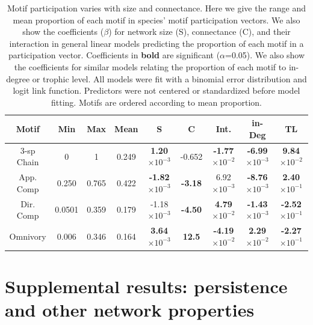 \documentclass[12pt]{article}
\begin{document}
\begin{spacing}{2.0}
    \begin{table}[hb!]
        \centering
        \caption{Motif participation varies with size and connectance. Here we give the range and mean proportion of each motif in species' motif participation vectors. 
        We also show the coefficients ($\beta$) for network size (S), connectance (C), and their interaction in general linear models predicting the proportion of each motif in a participation vector.
        Coefficients in \textbf{bold} are significant ($\alpha$=0.05).
        We also show the coefficients for similar models relating the proportion of each motif to in-degree or trophic level.
        All models were fit with a binomial error distribution and logit link function.
        Predictors were not centered or standardized before model fitting. Motifs are ordered according to mean proportion.}
        \label{tab:partic_vs_SC}   
        \footnotesize
        \begin{tabular}{c|c c c | c c c | c | c}
            Motif & Min & Max & Mean & S & C & Int. & in-Deg & TL \\
            \hline
            3-sp Chain & 0 & 1 & 0.249 & \textbf{1.20$\times10^{-3}$} &  -0.652 & \textbf{-1.77$\times10^{-2}$} & \textbf{-6.99$\times10^{-3}$} & \textbf{9.84$\times10^{-2}$} \\
            App. Comp & 0.250 & 0.765 & 0.422 & \textbf{-1.82$\times10^{-3}$} & \textbf{-3.18} & 6.92$\times10^{-3}$ & \textbf{-8.76$\times10^{-3}$} & \textbf{2.40$\times10^{-1}$}\\
            Dir. Comp & 0.0501 & 0.359 & 0.179 & -1.18$\times10^{-3}$ & \textbf{-4.50} & \textbf{4.79$\times10^{-2}$} & \textbf{-1.43$\times10^{-3}$} & \textbf{-2.52$\times10^{-1}$} \\
            Omnivory & 0.006 & 0.346 & 0.164 & \textbf{3.64$\times10^{-3}$} & \textbf{12.5} & \textbf{-4.19$\times10^{-2}$} & \textbf{2.29$\times10^{-2}$} & \textbf{-2.27$\times10^{-1}$}\\   
            \hline
            \end{tabular}
            \end{table}


\clearpage 

\section{Supplemental results: persistence and other network properties} 


\end{spacing}
\end{document}
